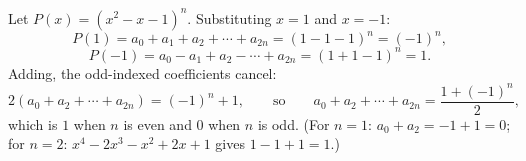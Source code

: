 Let $P(x)=\left(x^2-x-1\right)^n$. Substituting $x=1$ and $x=-1$:
\[P(1)=a_0+a_1+a_2+\cdots+a_{2n}=(1-1-1)^n=(-1)^n,\]
\[P(-1)=a_0-a_1+a_2-\cdots+a_{2n}=(1+1-1)^n=1.\]
Adding, the odd-indexed coefficients cancel:
\[2\left(a_0+a_2+\cdots+a_{2n}\right)=(-1)^n+1,\qquad\text{so}\qquad a_0+a_2+\cdots+a_{2n}=\boxed{\dfrac{1+(-1)^n}{2}},\]
which is $1$ when $n$ is even and $0$ when $n$ is odd. (For $n=1$: $a_0+a_2=-1+1=0$; for $n=2$: $x^4-2x^3-x^2+2x+1$ gives $1-1+1=1$.)
